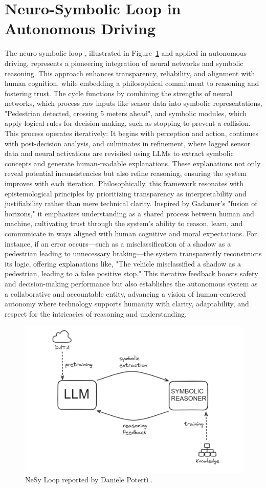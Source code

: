 \documentclass[times, twoside, watermark]{zHenriquesLab-StyleBioRxiv}
\begin{document}
\section*{Neuro-Symbolic Loop in Autonomous Driving}
The neuro-symbolic loop \cite{poterti2024neurosymbolic}, illustrated in Figure~\ref{fig:nesy} and applied in autonomous driving, represents a pioneering integration of neural networks and symbolic reasoning. This approach enhances transparency, reliability, and alignment with human cognition, while embedding a philosophical commitment to reasoning and fostering trust.
 The cycle functions by combining the strengths of neural networks, which process raw inputs like sensor data into symbolic representations, "Pedestrian detected, crossing 5 meters ahead", and symbolic modules, which apply logical rules for decision-making, such as stopping to prevent a collision. This process operates iteratively: It begins with perception and action, continues with post-decision analysis, and culminates in refinement, where logged sensor data and neural activations are revisited using LLMs to extract symbolic concepts and generate human-readable explanations. These explanations not only reveal potential inconsistencies but also refine reasoning, ensuring the system improves with each iteration. Philosophically, this framework resonates with epistemological principles by prioritizing transparency as interpretability and justifiability rather than mere technical clarity. Inspired by Gadamer's "fusion of horizons," it emphasizes understanding as a shared process between human and machine, cultivating trust through the system's ability to reason, learn, and communicate in ways aligned with human cognitive and moral expectations. For instance, if an error occurs—such as a misclassification of a shadow as a pedestrian leading to unnecessary braking—the system transparently reconstructs its logic, offering explanations like, "The vehicle misclassified a shadow as a pedestrian, leading to a false positive stop." This iterative feedback boosts safety and decision-making performance but also establishes the autonomous system as a collaborative and accountable entity, advancing a vision of human-centered autonomy where technology supports humanity with clarity, adaptability, and respect for the intricacies of reasoning and understanding.
\begin{figure}[H]
\centering
\includegraphics[width=.8\linewidth]{Figures/nesy loop.png}
\caption{NeSy Loop reported by Daniele Potertì \cite{poterti2024neurosymbolic}.}
\label{fig:nesy}
\end{figure}
\end{document}
